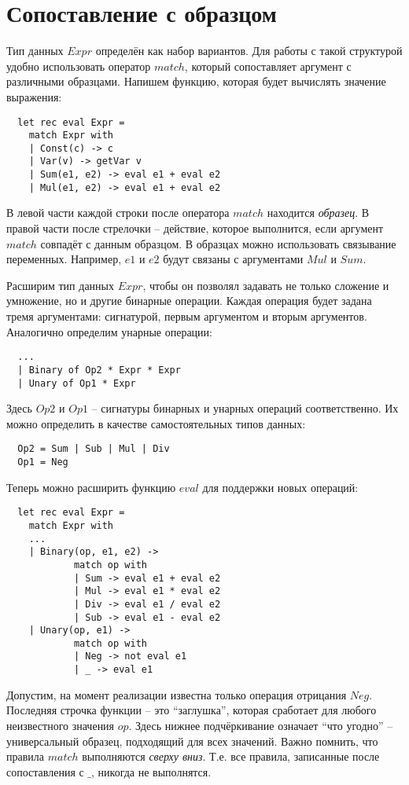 \documentclass[a4paper,11pt]{article}
\begin{document}
\section{Сопоставление с образцом}
Тип данных $Expr$ определён как набор вариантов. Для работы с такой структурой
удобно использовать оператор $match$, который сопоставляет аргумент с различными
образцами. Напишем функцию, которая будет вычислять значение выражения:
\begin{lstlisting}
  let rec eval Expr =
    match Expr with
    | Const(c) -> c
    | Var(v) -> getVar v
    | Sum(e1, e2) -> eval e1 + eval e2
    | Mul(e1, e2) -> eval e1 + eval e2
\end{lstlisting}
В левой части каждой строки после оператора $match$ находится \emph{образец}. В
правой части после стрелочки -- действие, которое выполнится, если аргумент
$match$ совпадёт с данным образцом. В образцах можно использовать связывание
переменных. Например, $e1$ и $e2$ будут связаны с аргументами $Mul$ и $Sum$.

Расширим тип данных $Expr$, чтобы он позволял задавать не только сложение и
умножение, но и другие бинарные операции. Каждая операция будет задана тремя
аргументами: сигнатурой, первым аргументом и вторым аргументов. Аналогично
определим унарные операции:
\begin{lstlisting}
  ...
  | Binary of Op2 * Expr * Expr
  | Unary of Op1 * Expr
\end{lstlisting}
Здесь $Op2$ и $Op1$ -- сигнатуры бинарных и унарных операций соответственно. Их
можно определить в качестве самостоятельных типов данных:
\begin{lstlisting}
  Op2 = Sum | Sub | Mul | Div
  Op1 = Neg
\end{lstlisting}
Теперь можно расширить функцию $eval$ для поддержки новых операций:
\begin{lstlisting}
  let rec eval Expr =
    match Expr with
    ...
    | Binary(op, e1, e2) -> 
            match op with 
            | Sum -> eval e1 + eval e2
            | Mul -> eval e1 * eval e2
            | Div -> eval e1 / eval e2
            | Sub -> eval e1 - eval e2
    | Unary(op, e1) -> 
            match op with 
            | Neg -> not eval e1
            | _ -> eval e1
\end{lstlisting}
Допустим, на момент реализации известна только операция отрицания $Neg$.
Последняя строчка функции -- это ``заглушка'', которая сработает для любого
неизвестного значения $op$. Здесь нижнее подчёркивание означает ``что угодно'' --
универсальный образец, подходящий для всех значений. Важно помнить, что правила
$match$ выполняются \emph{сверху вниз}. Т.е. все правила, записанные после
сопоставления с $\_$, никогда не выполнятся.
\end{document}
